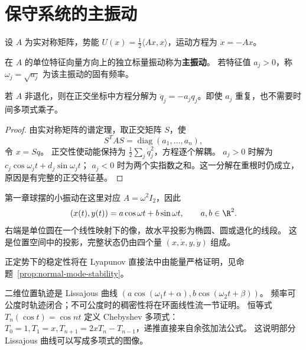 \section{保守系统的主振动}\label{sec:normal-modes}
设 $A$ 为实对称矩阵，势能
$U(x)=\frac12\langle Ax,x\rangle$，运动方程为 $\ddot x=-Ax$。
\begin{definition}
在 $A$ 的单位特征向量方向上的独立标量振动称为\textbf{主振动}。
若特征值 $a_j>0$，称 $\omega_j=\sqrt{a_j}$ 为该主振动的固有频率。
\end{definition}
\begin{theorem}
若 $A$ 非退化，则在正交坐标中方程分解为
$\ddot q_j=-a_jq_j$。即使 $a_j$ 重复，也不需要时间多项式乘子。

\end{theorem}
\begin{proof}
由实对称矩阵的谱定理，取正交矩阵 $S$，使
\[
 S^TAS=\operatorname{diag}(a_1,\ldots,a_n),
\]
令 $x=Sq$。
正交性使动能保持为 $\frac12\sum_j\dot q_j^2$，方程逐个解耦。
$a_j>0$ 时解为 $c_j\cos\omega_jt+d_j\sin\omega_jt$；
$a_j<0$ 时为两个实指数之和。这一分解在重根时仍成立，原因是有完整的正交特征基。

\end{proof}
\begin{example}[球摆的水平投影]
第一章球摆的小振动在这里对应 $A=\omega^2I_2$，因此
\[
 (x(t),y(t))=a\cos\omega t+b\sin\omega t,\qquad a,b\in\R^2.
\]
右端是单位圆在一个线性映射下的像，故水平投影为椭圆、圆或退化的线段。
这是位置空间中的投影，完整状态仍由四个量 $(x,\dot x,y,\dot y)$ 组成。
\end{example}
正定势下的稳定性将在 Lyapunov 直接法中由能量严格证明，见命题~\ref{prop:normal-mode-stability}。

二维位置轨迹是 Lissajous 曲线
$(a\cos(\omega_1t+\alpha),b\cos(\omega_2t+\beta))$。
频率可公度时轨迹闭合；不可公度时的稠密性将在环面线性流一节证明。
恒等式 $T_n(\cos t)=\cos nt$ 定义 Chebyshev 多项式：
$T_0=1,T_1=x,T_{n+1}=2xT_n-T_{n-1}$，递推直接来自余弦加法公式。
这说明部分 Lissajous 曲线可以写成多项式的图像。
